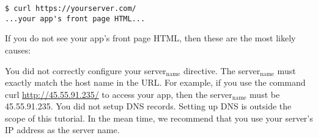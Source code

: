 \documentclass[11pt]{article}
\begin{document}
\begin{verbatim}
$ curl https://yourserver.com/
...your app's front page HTML...
\end{verbatim}

If you do not see your app's front page HTML, then these are the most likely causes:

You did not correctly configure your server\(_{\text{name}}\) directive. The server\(_{\text{name}}\) must exactly match the host name in the URL. For example, if you use the command curl \url{http://45.55.91.235/} to access your app, then the server\(_{\text{name}}\) must be 45.55.91.235.
You did not setup DNS records. Setting up DNS is outside the scope of this tutorial. In the mean time, we recommend that you use your server's IP address as the server name.
\end{document}
